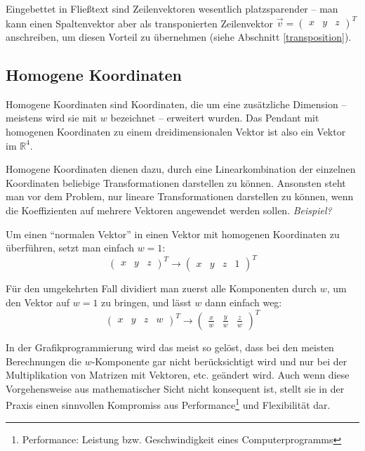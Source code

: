 Eingebettet in Fließtext sind Zeilenvektoren wesentlich platzsparender -- man kann einen Spaltenvektor aber als transponierten Zeilenvektor $\vec{v} = \begin{pmatrix} x & y & z \end{pmatrix}^T$ anschreiben, um diesen Vorteil zu übernehmen (siehe Abschnitt \ref{transposition}).


\subsection{Homogene Koordinaten}
Homogene Koordinaten sind Koordinaten, die um eine zusätzliche Dimension -- meistens wird sie mit $w$ bezeichnet -- erweitert wurden. Das Pendant mit homogenen Koordinaten zu einem dreidimensionalen Vektor ist also ein Vektor im $\mathbb{R}^4$.

Homogene Koordinaten dienen dazu, durch eine Linearkombination der einzelnen Koordinaten beliebige Transformationen darstellen zu können. Ansonsten steht man vor dem Problem, nur lineare Transformationen darstellen zu können, wenn die Koeffizienten auf mehrere Vektoren angewendet werden sollen. \emph{Beispiel?}

Um einen \enquote{normalen Vektor} in einen Vektor mit homogenen Koordinaten zu überführen, setzt man einfach $w = 1$:
\begin{equation}
 \begin{pmatrix} x & y & z \end{pmatrix}^T \rightarrow \begin{pmatrix} x & y & z & 1 \end{pmatrix}^T
\end{equation}

Für den umgekehrten Fall dividiert man zuerst alle Komponenten durch $w$, um den Vektor auf $w = 1$ zu bringen, und lässt $w$ dann einfach weg:
\begin{equation}
 \begin{pmatrix} x & y & z & w \end{pmatrix}^T \rightarrow \begin{pmatrix} \frac{x}{w} & \frac{y}{w} & \frac{z}{w} \end{pmatrix}^T
\end{equation}

In der Grafikprogrammierung wird das meist so gelöst, dass bei den meisten Berechnungen die $w$-Komponente gar nicht berücksichtigt wird und nur bei der Multiplikation von Matrizen mit Vektoren, etc. geändert wird. Auch wenn diese Vorgehensweise aus mathematischer Sicht nicht konsequent ist, stellt sie in der Praxis einen sinnvollen Kompromiss aus Performance\footnote{Performance: Leistung bzw. Geschwindigkeit eines Computerprogramms} und Flexibilität dar.

